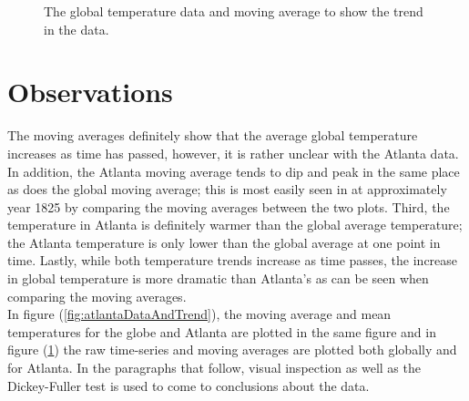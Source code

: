 \documentclass[12pt]{report}
\begin{document}
\begin{figure}
	\caption{\label{fig:globalDataAndTrend} The global temperature data and moving average to show the trend in the data.}
\end{figure}

\section{Observations}
The moving averages definitely show that the average global temperature increases as time has passed, however, it is rather unclear with the Atlanta data. In addition, the Atlanta moving average tends to dip and peak in the same place as does the global moving average; this is most easily seen in at approximately year 1825 by comparing the moving averages between the two plots. Third, the temperature in Atlanta is definitely warmer than the global average temperature; the Atlanta temperature is only lower than the global average at one point in time. Lastly, while both temperature trends increase as time passes, the increase in global temperature is more dramatic than Atlanta's as can be seen when comparing the moving averages.\\

\noindent In figure (\ref{fig:atlantaDataAndTrend}), the moving average and mean temperatures for the globe and Atlanta are plotted in the same figure and in figure (\ref{fig:globalDataAndTrend}) the raw time-series and moving averages are plotted both globally and for Atlanta. In the paragraphs that follow, visual inspection as well as the Dickey-Fuller test is used to come to conclusions about the data.\\
\end{document}
